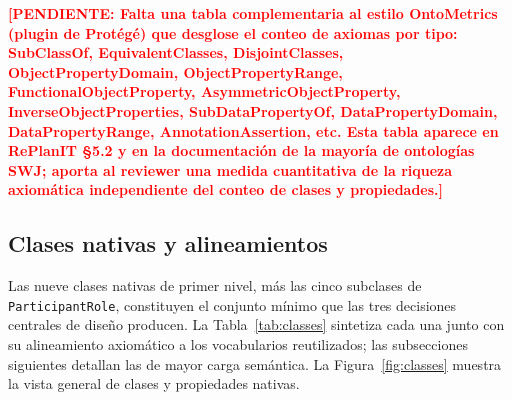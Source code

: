 \documentclass[11pt,a4paper]{article}
\newcommand{\code}[1]{\texttt{#1}}
\newcommand{\TODO}[1]{\textcolor{red}{\textbf{[PENDIENTE: #1]}}}
\begin{document}
\TODO{Falta una tabla complementaria al estilo OntoMetrics (plugin de Protégé) que desglose el conteo de axiomas por tipo: SubClassOf, EquivalentClasses, DisjointClasses, ObjectPropertyDomain, ObjectPropertyRange, FunctionalObjectProperty, AsymmetricObjectProperty, InverseObjectProperties, SubDataPropertyOf, DataPropertyDomain, DataPropertyRange, AnnotationAssertion, etc. Esta tabla aparece en RePlanIT §5.2 y en la documentación de la mayoría de ontologías SWJ; aporta al reviewer una medida cuantitativa de la riqueza axiomática independiente del conteo de clases y propiedades.}

\subsection{Clases nativas y alineamientos}\label{sec:classes}

Las nueve clases nativas de primer nivel, más las cinco subclases de \code{ParticipantRole}, constituyen el conjunto mínimo que las tres decisiones centrales de diseño producen. La Tabla~\ref{tab:classes} sintetiza cada una junto con su alineamiento axiomático a los vocabularios reutilizados; las subsecciones siguientes detallan las de mayor carga semántica. La Figura~\ref{fig:classes} muestra la vista general de clases y propiedades nativas.
\end{document}
